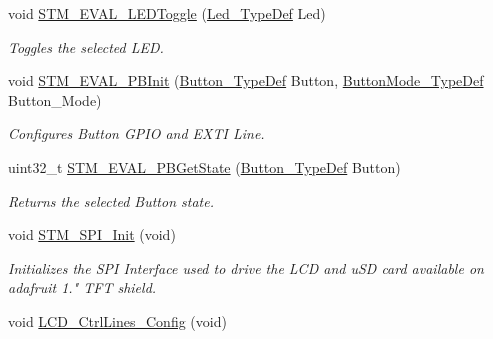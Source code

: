\begin{DoxyCompactItemize}
void \mbox{\hyperlink{group___s_t_m32_f1_x_x___n_u_c_l_e_o___l_o_w___l_e_v_e_l___private___functions_ga5b1ccd57cf505c1d41440e62a845e4a9}{S\+T\+M\+\_\+\+E\+V\+A\+L\+\_\+\+L\+E\+D\+Toggle}} (\mbox{\hyperlink{group___s_t_m32_f1_x_x___n_u_c_l_e_o___l_o_w___l_e_v_e_l___exported___types_gaa059704b7ca945eb9c1e7f2c3d03fecd}{Led\+\_\+\+Type\+Def}} Led)
\begin{DoxyCompactList}\small\item\em Toggles the selected L\+ED. \end{DoxyCompactList}\item 
void \mbox{\hyperlink{group___s_t_m32_f1_x_x___n_u_c_l_e_o___l_o_w___l_e_v_e_l___private___functions_ga1cdc19fe328ddcd17bf50fcb62d78369}{S\+T\+M\+\_\+\+E\+V\+A\+L\+\_\+\+P\+B\+Init}} (\mbox{\hyperlink{group___s_t_m32_f1_x_x___n_u_c_l_e_o___l_o_w___l_e_v_e_l___exported___types_ga643816dfbad5c734fc25a29ce8d35bb1}{Button\+\_\+\+Type\+Def}} Button, \mbox{\hyperlink{group___s_t_m32_f1_x_x___n_u_c_l_e_o___l_o_w___l_e_v_e_l___exported___types_ga48825b7c7d851c440ef8e808fd9d8f0a}{Button\+Mode\+\_\+\+Type\+Def}} Button\+\_\+\+Mode)
\begin{DoxyCompactList}\small\item\em Configures Button G\+P\+IO and E\+X\+TI Line. \end{DoxyCompactList}\item 
uint32\+\_\+t \mbox{\hyperlink{group___s_t_m32_f1_x_x___n_u_c_l_e_o___l_o_w___l_e_v_e_l___private___functions_ga812ee2a84aaed235587ac81eb9269442}{S\+T\+M\+\_\+\+E\+V\+A\+L\+\_\+\+P\+B\+Get\+State}} (\mbox{\hyperlink{group___s_t_m32_f1_x_x___n_u_c_l_e_o___l_o_w___l_e_v_e_l___exported___types_ga643816dfbad5c734fc25a29ce8d35bb1}{Button\+\_\+\+Type\+Def}} Button)
\begin{DoxyCompactList}\small\item\em Returns the selected Button state. \end{DoxyCompactList}\item 
void \mbox{\hyperlink{group___s_t_m32_f1_x_x___n_u_c_l_e_o___l_o_w___l_e_v_e_l___private___functions_ga7738cdccebd6af452a4843906acb8b31}{S\+T\+M\+\_\+\+S\+P\+I\+\_\+\+Init}} (void)
\begin{DoxyCompactList}\small\item\em Initializes the S\+PI Interface used to drive the L\+CD and u\+SD card available on adafruit 1." T\+FT shield. \end{DoxyCompactList}\item 
void \mbox{\hyperlink{group___s_t_m32_f1_x_x___n_u_c_l_e_o___l_o_w___l_e_v_e_l___private___functions_ga97c5f806cbaa70bc21a31c96ce30c700}{L\+C\+D\+\_\+\+Ctrl\+Lines\+\_\+\+Config}} (void)

\end{DoxyCompactItemize}
